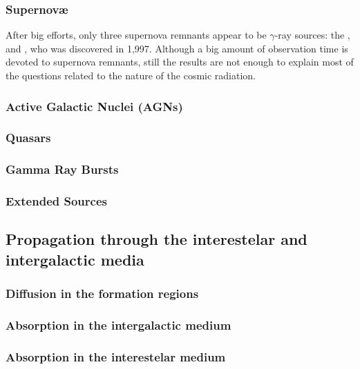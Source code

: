 \subsubsection{Supernov\ae}

After big efforts, only three supernova remnants appear to be
$\gamma$-ray sources: the ,  and ,
who was discovered in 1,997. Although a big amount of observation time
is devoted to supernova remnants, still the results are not enough to
explain most of the questions related to the nature of the cosmic
radiation.

\subsubsection{Active Galactic Nuclei (AGNs)}

\subsubsection{Quasars}

\subsubsection{Gamma Ray Bursts}

\subsubsection{Extended Sources}

\subsection{Propagation through the interestelar and
intergalactic media}

\gsourcesfig

\gsnumbersfig

\bhstarevolfig

\subsubsection{Diffusion in the formation regions}

\subsubsection{Absorption in the intergalactic medium}

\subsubsection{Absorption in the interestelar medium}

